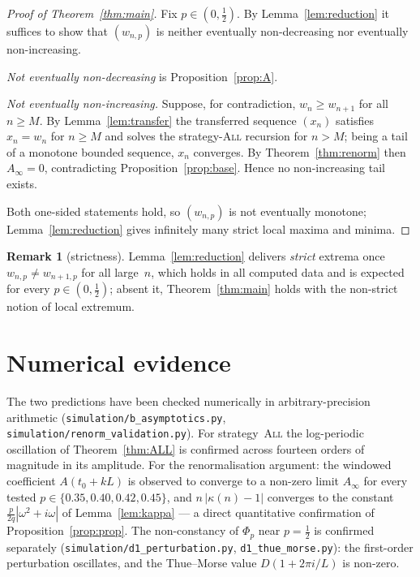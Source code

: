 \documentclass[11pt]{article}
\theoremstyle{definition}
\newtheorem{remark}[theorem]{Remark}
\newcommand{\All}{\textsc{All}}
\begin{document}
\begin{proof}[Proof of Theorem~\ref{thm:main}]
  Fix $p\in(0,\tfrac12)$. By Lemma~\ref{lem:reduction} it suffices to
  show that $(w_{n,p})$ is neither eventually non-decreasing nor
  eventually non-increasing.

  \emph{Not eventually non-decreasing} is Proposition~\ref{prop:A}.

  \emph{Not eventually non-increasing.} Suppose, for contradiction,
  $w_n\ge w_{n+1}$ for all $n\ge M$. By Lemma~\ref{lem:transfer} the
  transferred sequence $(x_n)$ satisfies $x_n=w_n$ for $n\ge M$ and
  solves the strategy-\All{} recursion for $n>M$; being a tail of a
  monotone bounded sequence, $x_n$ converges. By
  Theorem~\ref{thm:renorm} then $A_\infty=0$, contradicting
  Proposition~\ref{prop:base}. Hence no non-increasing tail exists.

  Both one-sided statements hold, so $(w_{n,p})$ is not eventually
  monotone; Lemma~\ref{lem:reduction} gives infinitely many strict
  local maxima and minima.
\end{proof}

\begin{remark}[strictness]
  Lemma~\ref{lem:reduction} delivers \emph{strict} extrema once
  $w_{n,p}\ne w_{n+1,p}$ for all large~$n$, which holds in all
  computed data and is expected for every $p\in(0,\tfrac12)$; absent
  it, Theorem~\ref{thm:main} holds with the non-strict notion of
  local extremum.
\end{remark}

\section{Numerical evidence}\label{sec:numerics}

The two predictions have been checked numerically in
arbitrary-precision arithmetic (\texttt{simulation/b\_asymptotics.py},
\texttt{simulation/renorm\_validation.py}). For strategy~\All{} the
log-periodic oscillation of Theorem~\ref{thm:ALL} is confirmed across
fourteen orders of magnitude in its amplitude. For the renormalisation
argument: the windowed coefficient $A(t_0+kL)$ is observed to converge
to a non-zero limit $A_\infty$ for every tested $p\in\{0.35,0.40,
0.42,0.45\}$, and $n\,|\kappa(n)-1|$ converges to the constant
$\tfrac{p}{2q}|\omega^2+i\omega|$ of Lemma~\ref{lem:kappa} --- a
direct quantitative confirmation of Proposition~\ref{prop:prop}.
The non-constancy of $\Phi_p$ near $p=\tfrac12$ is confirmed
separately (\texttt{simulation/d1\_perturbation.py},
\texttt{d1\_thue\_morse.py}): the first-order perturbation
oscillates, and the Thue--Morse value $D(1+2\pi i/L)$ is non-zero.
\end{document}

